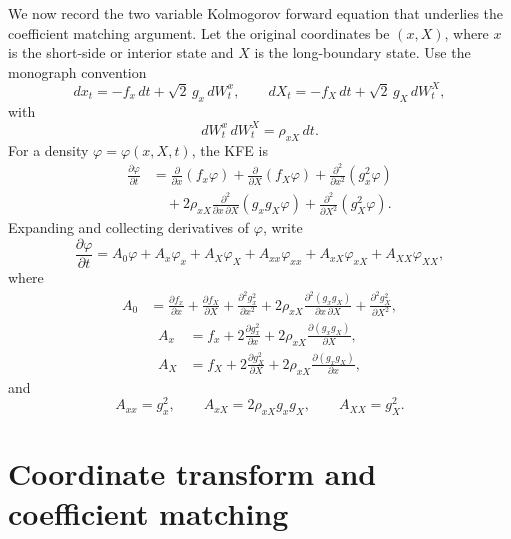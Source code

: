 \documentclass[11pt]{article}
\numberwithin{equation}{section}
\begin{document}
We now record the two variable Kolmogorov forward equation that underlies the coefficient matching argument. Let the original coordinates be \((x,X)\), where \(x\) is the short-side or interior state and \(X\) is the long-boundary state. Use the monograph convention
\begin{equation}
\label{eq:xX-sde}
dx_t=-f_x\,dt+\sqrt{2}\,g_x\,dW_t^x,
\qquad
dX_t=-f_X\,dt+\sqrt{2}\,g_X\,dW_t^X,
\end{equation}
with
\begin{equation}
\label{eq:xX-corr}
dW_t^x\,dW_t^X=\rho_{xX}\,dt.
\end{equation}
For a density \(\varphi=\varphi(x,X,t)\), the KFE is
\begin{align}
\label{eq:xX-KFE-conservative}
\frac{\partial\varphi}{\partial t}
&=
\frac{\partial}{\partial x}(f_x\varphi)
+
\frac{\partial}{\partial X}(f_X\varphi)
+
\frac{\partial^2}{\partial x^2}(g_x^2\varphi)
\nonumber\\
&\quad+
2\rho_{xX}\frac{\partial^2}{\partial x\,\partial X}(g_xg_X\varphi)
+
\frac{\partial^2}{\partial X^2}(g_X^2\varphi).
\end{align}
Expanding and collecting derivatives of \(\varphi\), write
\begin{equation}
\label{eq:xX-KFE-expanded}
\frac{\partial\varphi}{\partial t}
=
A_0\varphi+A_x\varphi_x+A_X\varphi_X+A_{xx}\varphi_{xx}+A_{xX}\varphi_{xX}+A_{XX}\varphi_{XX},
\end{equation}
where
\begin{align}
\label{eq:A0}
A_0
&=
\frac{\partial f_x}{\partial x}
+
\frac{\partial f_X}{\partial X}
+
\frac{\partial^2 g_x^2}{\partial x^2}
+
2\rho_{xX}\frac{\partial^2(g_xg_X)}{\partial x\,\partial X}
+
\frac{\partial^2 g_X^2}{\partial X^2},
\end{align}
\begin{align}
\label{eq:AxAX}
A_x
&=
f_x+2\frac{\partial g_x^2}{\partial x}
+2\rho_{xX}\frac{\partial(g_xg_X)}{\partial X},
\\
A_X
&=
f_X+2\frac{\partial g_X^2}{\partial X}
+2\rho_{xX}\frac{\partial(g_xg_X)}{\partial x},
\end{align}
and
\begin{equation}
\label{eq:A-second}
A_{xx}=g_x^2,
\qquad
A_{xX}=2\rho_{xX}g_xg_X,
\qquad
A_{XX}=g_X^2.
\end{equation}

\section{Coordinate transform and coefficient matching}
\end{document}
